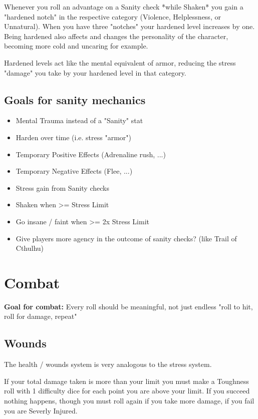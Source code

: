 Whenever you roll an advantage on a Sanity check *while Shaken* you gain a "hardened notch" in the respective category (Violence, Helplessness, or Unnatural). When you have three "notches" your hardened level increases by one. 
Being hardened also affects and changes the personality of the character, becoming more cold and uncaring for example.

Hardened levels act like the mental equivalent of armor, reducing the stress "damage" you take by your hardened level in that category.


\section{Goals for sanity mechanics}
\begin{itemize}
    \item Mental Trauma instead of a "Sanity" stat
    \item Harden over time (i.e. stress "armor")
    \item Temporary Positive Effects (Adrenaline rush, ...)
    \item Temporary Negative Effects (Flee, ...)
    \item Stress gain from Sanity checks
    \item Shaken when >= Stress Limit
    \item Go insane / faint when >= 2x Stress Limit
    \item Give players more agency in the outcome of sanity checks? (like Trail of Cthulhu)
\end{itemize}


\chapter{Combat}

\textbf{Goal for combat:} Every roll should be meaningful, not just endless "roll to hit, roll for damage, repeat" 

\section{Wounds}
The health / wounds system is very analogous to the stress system.

If your total damage taken is more than your limit you must make a Toughness roll with 1 difficulty dice for each point you are above your limit.  
If you succeed nothing happens, though you must roll again if you take more damage, if you fail you are Severly Injured.

